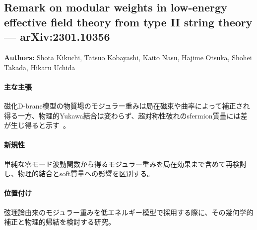 \subsection{Remark on modular weights in low-energy effective field theory from type II string theory --- arXiv:2301.10356}

\textbf{Authors:} Shota Kikuchi, Tatsuo Kobayashi, Kaito Nasu, Hajime Otsuka, Shohei Takada, Hikaru Uchida

\paragraph{主な主張}
磁化D-brane模型の物質場のモジュラー重みは局在磁束や曲率によって補正され得る一方、物理的Yukawa結合は変わらず、超対称性破れのsfermion質量には差が生じ得ると示す~\cite{Kikuchi:2023clx}。

\paragraph{新規性}
単純な零モード波動関数から得るモジュラー重みを局在効果まで含めて再検討し、物理的結合とsoft質量への影響を区別する。

\paragraph{位置付け}
弦理論由来のモジュラー重みを低エネルギー模型で採用する際に、その幾何学的補正と物理的帰結を検討する研究。
